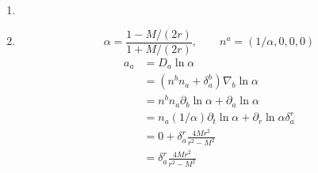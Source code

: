 \documentclass[10pt]{article}
\begin{document}
\begin{enumerate}
\begin{enumerate}
  \item 
  \item \begin{equation}
      \label{eq:alpha}
      \alpha = \frac{1-M/(2r)}{1+M/(2r)},\qquad n^a = (1/\alpha, 0, 0, 0)
    \end{equation}
    \begin{align}
      \label{eq:acceleration}
      a_a
      & = D_a \ln \alpha\\
      & = (n^b n_a + \delta^b_a)\nabla_b \ln \alpha\\
      & = n^b n_a \partial_b\ln\alpha + \partial_a\ln \alpha\\
      & = n_a (1/\alpha)\partial_t\ln\alpha + \partial_r \ln\alpha \delta^r_a\\
      & = 0 + \delta^r_a \frac{4Mr^2}{r^2 - M^2}\\
      & = \delta^r_a \frac{4Mr^2}{r^2 - M^2}
    \end{align}
  \end{enumerate}
  

\end{enumerate}
\end{document}
